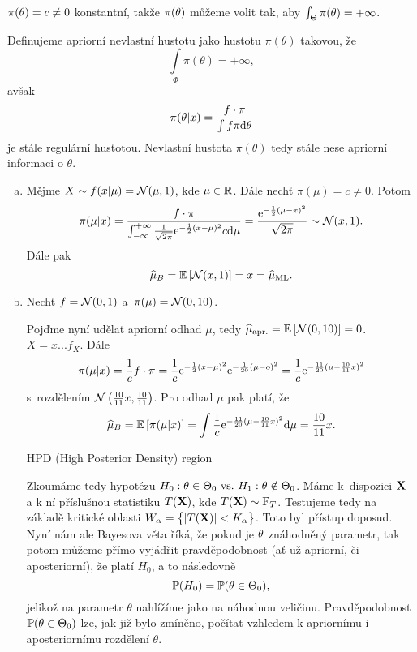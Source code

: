 

$\pi(\theta)=c\neq0$ konstantní, takže $\pi(\theta)$ můžeme volit tak, aby $\int_\Theta\pi(\theta)=+\infty$.
\begin{define} Definujeme apriorní nevlastní hustotu jako hustotu $\pi(\theta)$ takovou, že $$ \int\limits_{\Phi}{\pi(\theta)} = +\infty,$$  avšak 
	$$\pi(\theta|x)=\frac{f\cdot \pi}{\int f\pi\mathrm{d}\theta}$$ je stále regulární hustotou. Nevlastní hustota $\pi(\theta)$ tedy stále nese apriorní informaci o $\theta$.
\end{define}
\begin{example}\begin{enumerate}[a)]
		\item 
	Mějme $X\sim f(x|\mu)=\mathcal{N}(\mu,1)$, kde $\mu\in\mathbb{R}$. Dále nechť $\pi(\mu)=c\neq0$. Potom$$ \pi(\mu|x)=\frac{f\cdot \pi}{\int_{-\infty}^{+\infty}\frac{1}{\sqrt{2\pi}}\mathrm{e}^{-\frac{1}{2}(x-\mu)^2}c\mathrm{d}\mu}=\frac{\mathrm{e}^{-\frac{1}{2}(\mu-x)^2}}{\sqrt{2\pi}}\sim\mathcal{N}(x,1).$$
	Dále pak 
	$$\widehat{\mu}_B=\mathbb{E}\left[ \mathcal{N}(x,1) \right]=x=\widehat{\mu}_{\mathrm{ML}}.$$
	\item Nechť $f=\mathcal{N}(0,1)$ a~$\pi(\mu)=\mathcal{N}(0,10)$.
	
	
	
	Pojďme nyní udělat apriorní odhad $\mu$, tedy $\widehat{\mu}_{\mathrm{apr.}}=\mathbb{E}\left[ \mathcal{N}(0,10) \right]=0$. $X=x...f_X$. Dále
	$$ \pi(\mu|x)=\frac{1}{c}f\cdot\pi=\frac{1}{c}\mathrm{e}^{-\frac{1}{2}(x-\mu)^2}\mathrm{e}^{-\frac{1}{20}(\mu-o)^2}=\frac{1}{c}\mathrm{e}^{-\frac{11}{20}(\mu-\frac{10}{11}x)^2}$$ s~rozdělením $\mathcal{N}\left(\frac{10}{11}x,\frac{10}{11}\right)$.
	Pro odhad $\mu$ pak platí, že
	$$\widehat{\mu}_B=\mathbb{E}\left[ \pi(\mu|x) \right]=\int\frac{1}{c}\mathrm{e}^{-\frac{11}{20}(\mu-\frac{10}{11}x)^2}\mathrm{d}\mu=\frac{10}{11}x.$$ 
	
	HPD (High Posterior Density) region
	
	
	
	Zkoumáme tedy hypotézu $H_0: \theta\in\Theta_0 ~\text{vs.}~ H_1: \theta\notin\Theta_0$. Máme k~dispozici $\textbf{X}$ a k ní příslušnou statistiku $T(\textbf{X})$, kde $T(\textbf{X})\sim\mathrm{F}_T$. Testujeme tedy na základě kritické oblasti $W_\alpha=\big\{ |T(\textbf{X})|<K_\alpha \big\}$. Toto byl přístup doposud. Nyní nám ale Bayesova věta říká, že pokud je $\theta$ znáhodněný parametr, tak potom můžeme přímo vyjádřit pravděpodobnost (ať už apriorní, či aposteriorní), že platí $H_0$, a to následovně
	$$\mathbb{P}(H_0) = \mathbb{P}(\theta \in \Theta_0),$$
	jelikož na parametr $\theta$ nahlížíme jako na náhodnou veličinu. Pravděpodobnost $\mathbb{P}(\theta \in \Theta_0)$ lze, jak již bylo zmíněno, počítat vzhledem k apriornímu i aposteriornímu rozdělení $\theta$.
	\end{enumerate}
\end{example}
